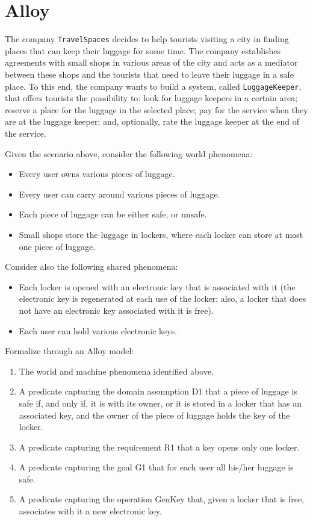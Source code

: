\section{Alloy}

The company \texttt{TravelSpaces} decides to help tourists visiting a city in finding places that can keep their luggage 
for some time. The company establishes agreements with small shops in various areas of the city and 
acts as a mediator between these shops and the tourists that need to leave their luggage in a safe
place. To this end, the company wants to build a system, called \texttt{LuggageKeeper}, that offers tourists 
the possibility to: look for luggage keepers in a certain area; reserve a place for the luggage in 
the selected place; pay for the service when they are at the luggage keeper; and, optionally, rate 
the luggage keeper at the end of the service.

Given the scenario above, consider the following world phenomena:
\begin{itemize}
    \item Every user owns various pieces of luggage.
    \item Every user can carry around various pieces of luggage.
    \item Each piece of luggage can be either safe, or unsafe.
    \item Small shops store the luggage in lockers, where each locker can store at most one piece of luggage. 
\end{itemize}

Consider also the following shared phenomena:
\begin{itemize}
    \item Each locker is opened with an electronic key that is associated with it (the electronic key is regenerated at each use of the locker; also, a locker that does not have an electronic key associated with it is free).
    \item Each user can hold various electronic keys. 
\end{itemize}

Formalize through an Alloy model:
\begin{enumerate}
    \item The world and machine phenomena identified above.
    \item A predicate capturing the domain assumption D1 that a piece of luggage is safe if, and only if, it is with its owner, or it is stored in a locker that has an associated key, and the owner of the piece of luggage holds the key of the locker.
    \item A predicate capturing the requirement R1 that a key opens only one locker.
    \item A predicate capturing the goal G1 that for each user all his/her luggage is safe.
    \item A predicate capturing the operation GenKey that, given a locker that is free, associates with it a new electronic key.
\end{enumerate}
